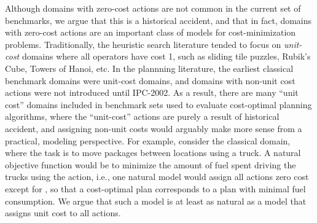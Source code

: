 Although domains with zero-cost actions are not common in the current set of benchmarks, we argue that this is a historical accident, and that in fact, domains with zero-cost actions are an important class of models for cost-minimization problems.
% 
Traditionally, the heuristic search literature tended to focus on \emph{unit-cost} domains where all operators have cost 1, such as sliding tile puzzles, Rubik's Cube, Towers of Hanoi, etc.
% 
In the plannning literature,  the earliest classical benchmark domains were unit-cost domains, and domains with non-unit cost actions  were not introduced until 
 IPC-2002. 
As a result, there are many ``unit cost'' domains included in benchmark sets used to evaluate 
cost-optimal planning algorithms, where the ``unit-cost'' actions are purely a result of historical accident, and assigning non-unit costs would arguably make more sense from a practical, modeling perspective. 
For example, consider the classical  domain, where the task is to move packages between locations using a truck. 
A natural objective function would be to minimize the amount of fuel spent driving the trucks using the  action, 
i.e., one natural model would assign all actions zero cost except for , so that a cost-optimal plan corresponds to a plan with minimal fuel consumption.
We argue that such a model is at least as natural as a model that assigns unit cost to all actions.






